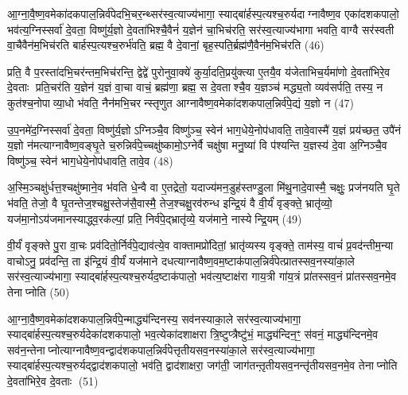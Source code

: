 {\anuvakamend[{अपि॒ त स्यु॑र्वैन्ध भवति॒ चतु॑र्दश च॥७॥}]}

आ॒ग्ना॒वै॒ष्ण॒वमेका॑दकपाल॒न्निर्व॑पेदभि॒चर॒न्थ्सर॑स्व॒त्याज्य॑भागा॒ स्याद्बा॑र्\mbox{}हस्प॒त्यश्च॒रुर्यदाग्नावैष्ण॒व एका॑दशकपालो॒ भव॑त्य॒ग्निस्सर्वा॑ दे॒वता॒ विष्णु॑र्य॒ज्ञो दे॒वता॑भिश्चै॒वैनं॑ य॒ज्ञेन॑ चा॒भिच॑रति॒ सर॑स्व॒त्याज्य॑भागा भवति॒ वाग्वै सर॑स्वती वा॒चैवैन॑म॒भिच॑रति बार्\mbox{}हस्प॒त्यश्च॒रुर्भ॑वति॒ ब्रह्म॒ वै दे॒वानां॒ बृह॒स्पति॒र्ब्रह्म॑णै॒वैन॑म॒भिच॑रति (46)

प्रति॒ वै प॒रस्ता॑दभि॒चर॑न्तम॒भिच॑रन्ति॒ द्वेद्वे॑ पुरोनुवा॒क्ये॑ कुर्या॒दति॒प्रयु॑क्त्या ए॒तयै॒व य॑जेताभिच॒र्यमा॑णो दे॒वता॑भिरे॒व दे॒वताः प्रति॒चर॑ति य॒ज्ञेन॑ य॒ज्ञं वा॒चा वाचं॒ ब्रह्म॑णा॒ ब्रह्म॒ स दे॒वताश्चै॒व य॒ज्ञञ्च॑ मद्ध्य॒तो व्यव॑सर्पति॒ तस्य॒ न कुत॑श्च॒नोपाव्या॒धो भ॑वति॒ नैन॑मभि॒चरन्स्तृणुत आग्नावैष्ण॒वमेका॑दशकपाल॒न्निर्व॑पे॒द्यं य॒ज्ञो न (47)

उ॒प॒नमे॑द॒ग्निस्सर्वा॑ दे॒वता॒ विष्णु॑र्य॒ज्ञोऽग्निञ्चै॒व विष्णु॑ञ्च॒ स्वेन॑ भाग॒धेये॒नोप॑धावति॒ तावे॒वास्मै॑ य॒ज्ञं प्रय॑च्छत॒ उपै॑नं य॒ज्ञो न॑मत्याग्नावैष्ण॒वङ्घृ॒ते च॒रुन्निर्व॑पे॒च्चक्षु॑ष्कामो॒ऽग्नेर्वै चक्षु॑षा मनु॒ष्या॑ वि प॑श्यन्ति य॒ज्ञस्य॑ दे॒वा अ॒ग्निञ्चै॒व विष्णु॑ञ्च॒ स्वेन॑ भाग॒धेये॒नोप॑धावति॒ तावे॒व (48)

अ॒स्मि॒ञ्चक्षु॑र्धत्त॒श्चक्षु॑ष्माने॒व भ॑वति धे॒न्वै वा ए॒तद्रेतो॒ यदाज्य॑मन॒डुह॑स्तण्डु॒ला मि॑थु॒नादे॒वास्मै॒ चक्षुः॒ प्रज॑नयति घृ॒ते भ॑वति॒ तेजो॒ वै घृ॒तन्तेज॒श्चक्षु॒स्तेज॑सै॒वास्मै॒ तेज॒श्चक्षु॒रव॑रुन्ध इन्द्रि॒यं वै वी॒र्यं॑ वृङ्क्ते॒ भ्रातृ॑व्यो॒ यज॑मा॒नोऽय॑जमानस्याद्ध्व॒रक॑ल्पां॒ प्रति॒ निर्व॑पे॒द्भ्रातृ॑व्ये॒ यज॑माने॒ नास्येन्द्रि॒यम् (49)

वी॒र्यं॑ वृङ्क्ते पु॒रा वा॒चः प्रव॑दितो॒र्निर्व॑पे॒द्याव॑त्ये॒व वाक्तामप्रो॑दितां॒ भ्रातृ॑व्यस्य वृङ्क्ते॒ ताम॑स्य॒ वाचं॑ प्र॒वद॑न्तीम॒न्या वाचोऽनु॒ प्रव॑दन्ति॒ ता इ॑न्द्रि॒यं वी॒र्यं॑ यज॑माने दधत्याग्नावैष्ण॒वम॒ष्टाक॑पाल॒न्निर्व॑पेत्प्रातस्सव॒नस्या॑का॒ले सर॑स्व॒त्याज्य॑भागा॒ स्याद्बा॑र्\mbox{}हस्प॒त्यश्च॒रुर्यद॒ष्टाक॑पालो॒ भव॑त्य॒ष्टाक्ष॑रा गाय॒त्री गा॑य॒त्रं प्रा॑तस्सव॒नं प्रा॑तस्सव॒नमे॒व तेनाप्नोति (50)

आ॒ग्ना॒वै॒ष्ण॒वमेका॑दशकपाल॒न्निर्व॑पे॒न्माद्ध्य॑न्दिनस्य॒ सव॑नस्याका॒ले सर॑स्व॒त्याज्य॑भागा॒ स्याद्बा॑र्\mbox{}हस्प॒त्यश्च॒रुर्यदेका॑दशकपालो॒ भव॒त्येका॑दशाक्षरा त्रि॒ष्टुप्त्रैष्टु॑भं॒ माद्ध्य॑न्दिन॒ꣳ॒ स॑वनं॒ माद्ध्य॑न्दिनमे॒व सव॑न॒न्तेनाप्नोत्याग्नावैष्ण॒वन्द्वाद॑शकपाल॒न्निर्व॑पेत्तृतीयसव॒नस्या॑का॒ले सर॑स्व॒त्याज्य॑भागा॒ स्याद्बा॑र्\mbox{}हस्प॒त्यश्च॒रुर्यद्द्वाद॑शकपालो॒ भव॑ति॒ द्वाद॑शाक्षरा॒ जग॑ती॒ जाग॑तन्त़ृतीयसव॒नन्तृ॑तीयसव॒नमे॒व तेनाप्नोति दे॒वता॑भिरे॒व दे॒वताः (51)


